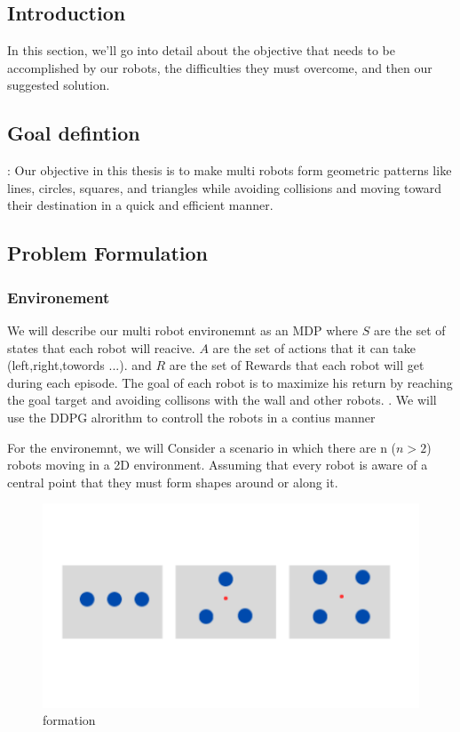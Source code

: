 \documentclass[12pt]{extarticle}
\begin{document}
\pagebreak

 

\subsection{Introduction}
 In this section, we'll go into  detail about the objective that needs to be accomplished by our robots, the difficulties they must overcome, and then our suggested solution.
 
\subsection{Goal defintion}:
Our objective in this thesis is to make multi robots  form geometric patterns like lines, circles, squares, and triangles while avoiding collisions and moving toward their destination in a quick and efficient manner. 



\subsection{Problem Formulation}
 

\subsubsection{Environement}

We will describe our multi robot environemnt as an MDP where $S$ are the set of states that each robot will reacive. $A$ are the set of actions that it can take (left,right,towords ...). and $R$ are the set of Rewards that each robot will get during each episode.
The  goal of each robot is to  maximize his return by reaching the goal target and avoiding collisons with the wall and other  robots.
.
We will use the DDPG alrorithm to controll the robots in a contius manner




For the environemnt, we will Consider a scenario in which there are n ($n >  2$) robots moving in a 2D environment. Assuming that every robot is aware of a central point that they must form shapes around or along it.


 
 \begin{figure}[h]  
\centering
\includegraphics[scale=0.4]{formation}
\caption[formation]{formation}
\end{figure}
\end{document}
